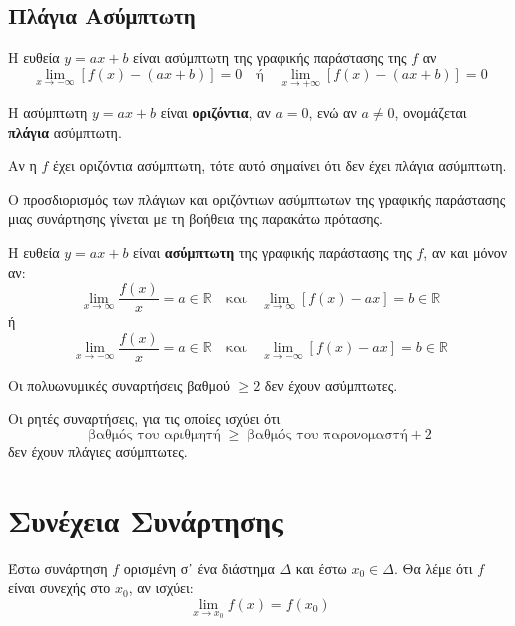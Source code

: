 \subsection*{Πλάγια Ασύμπτωτη}
\begin{dfn}
  Η ευθεία $ y=ax+b $ είναι \textcolor{Col1}{ασύμπτωτη} της γραφικής παράστασης της 
  $ f $ αν 
  \[
    \lim_{x \to - \infty} [f(x) - (ax+b)] = 0 \quad \text{ή} \quad 
    \lim_{x \to + \infty} [f(x) - (ax+b)] = 0
  \] 
\end{dfn}

\begin{rem}
  Η ασύμπτωτη $ y=ax+b $ είναι \textbf{οριζόντια}, αν $ a=0 $, ενώ αν $ a \neq 0 $, 
  ονομάζεται \textbf{πλάγια} ασύμπτωτη.
\end{rem}

\begin{rem}
  Αν η $f$ έχει οριζόντια ασύμπτωτη, τότε αυτό σημαίνει ότι δεν έχει πλάγια ασύμπτωτη.
\end{rem}

Ο προσδιορισμός των πλάγιων και οριζόντιων ασύμπτωτων της γραφικής παράστασης μιας 
συνάρτησης γίνεται με τη βοήθεια της παρακάτω πρότασης.

\begin{prop}
  Η ευθεία $ y=ax+b $ είναι \textbf{ασύμπτωτη} της γραφικής παράστασης της $f$, 
  αν και μόνον αν:
  \[
    \lim_{x \to \infty} \frac{f(x)}{x} = a \in \mathbb{R} \quad \text{και} \quad 
    \lim_{x \to \infty} [f(x)-ax] = b \in \mathbb{R}
  \] 
  ή
  \[
    \lim_{x \to -\infty} \frac{f(x)}{x} = a \in \mathbb{R} \quad \text{και} \quad 
    \lim_{x \to -\infty} [f(x)-ax] = b \in \mathbb{R}
  \]
\end{prop}

\begin{myitemize}
  \item Οι πολυωνυμικές συναρτήσεις βαθμού $ \geq 2 $ δεν έχουν ασύμπτωτες.
  \item Οι ρητές συναρτήσεις, για τις οποίες ισχύει ότι 
    \[ 
      \text{βαθμός του αριθμητή} \; \geq \; \text{βαθμός του παρονομαστή} + 2
    \] 
    δεν έχουν πλάγιες ασύμπτωτες.
\end{myitemize}

\section*{Συνέχεια Συνάρτησης}

\begin{dfn}
  Έστω συνάρτηση $f$ ορισμένη σ᾽ ένα διάστημα $\Delta$ και έστω $ x_{0} \in \Delta $. 
  Θα λέμε ότι $ f $ είναι \textcolor{Col1}{συνεχής στο $ x_{0} $}, αν ισχύει:
  \[
    \lim_{x \to x_{0}} f(x) = f(x_{0})  
  \] 
\end{dfn}

